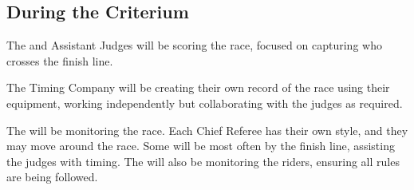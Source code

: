 \subsection{During the Criterium}

The  and Assistant Judges will be scoring the race, focused on capturing who crosses the finish line.

The Timing Company will be creating their own record of the race using their equipment, working independently but collaborating with the judges as required.

The  will be monitoring the race.  Each Chief Referee has their own style, and they may move around the race.
Some will be most often by the finish line, assisting the judges with timing.
The  will also be monitoring the riders, ensuring all rules are being followed.
